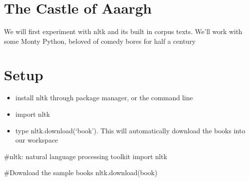 \documentclass[
  letterpaper,
  DIV=11,
  numbers=noendperiod]{scrreprt}
\newenvironment{Shaded}{\begin{snugshade}}{\end{snugshade}}
\newcommand{\CommentTok}[1]{\textcolor[rgb]{0.37,0.37,0.37}{#1}}
\newcommand{\ImportTok}[1]{\textcolor[rgb]{0.00,0.46,0.62}{#1}}
\newcommand{\NormalTok}[1]{\textcolor[rgb]{0.00,0.23,0.31}{#1}}
\newcommand{\StringTok}[1]{\textcolor[rgb]{0.13,0.47,0.30}{#1}}
\providecommand{\tightlist}{%
  \setlength{\itemsep}{0pt}\setlength{\parskip}{0pt}}\usepackage{longtable,booktabs,array}
\begin{document}
\hypertarget{the-castle-of-aaargh}{%
\section{The Castle of Aaargh}\label{the-castle-of-aaargh}}

We will first experiment with nltk and its built in corpus texts. We'll
work with some Monty Python, beloved of comedy bores for half a century

\hypertarget{setup}{%
\section{Setup}\label{setup}}

\begin{itemize}
\tightlist
\item
  install nltk through package manager, or the command line
\item
  import nltk
\item
  type nltk.download(`book'). This will automatically download the books
  into our workspace
\end{itemize}

\begin{Shaded}
\begin{Highlighting}[]
\CommentTok{\#nltk: natural language processing toolkit}
\ImportTok{import}\NormalTok{ nltk}
\end{Highlighting}
\end{Shaded}

\begin{Shaded}
\begin{Highlighting}[]
\CommentTok{\#Download the sample books}
\NormalTok{nltk.download(}\StringTok{\textquotesingle{}book\textquotesingle{}}\NormalTok{)}
\end{Highlighting}
\end{Shaded}
\end{document}
